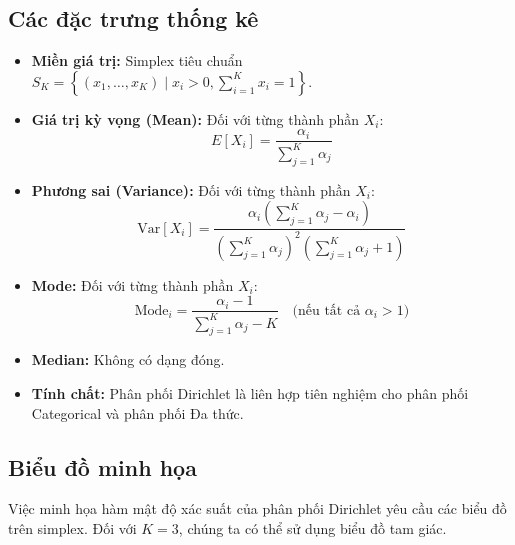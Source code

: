 	\subsection{Các đặc trưng thống kê}
	\begin{itemize}[leftmargin=*]
		\item \textbf{Miền giá trị:} Simplex tiêu chuẩn $S_K = \left\{ (x_1, \dots, x_K) \mid x_i > 0, \sum_{i=1}^K x_i = 1 \right\}$.
		\item \textbf{Giá trị kỳ vọng (Mean):} Đối với từng thành phần $X_i$:
		\[ E[X_i] = \frac{\alpha_i}{\sum_{j=1}^K \alpha_j} \]
		\item \textbf{Phương sai (Variance):} Đối với từng thành phần $X_i$:
		\[ \text{Var}[X_i] = \frac{\alpha_i \left( \sum_{j=1}^K \alpha_j - \alpha_i \right)}{\left( \sum_{j=1}^K \alpha_j \right)^2 \left( \sum_{j=1}^K \alpha_j + 1 \right)} \]
		\item \textbf{Mode:} Đối với từng thành phần $X_i$:
		\[ \text{Mode}_i = \frac{\alpha_i-1}{\sum_{j=1}^K \alpha_j - K} \quad \text{(nếu tất cả } \alpha_i > 1 \text{)} \]
		\item \textbf{Median:} Không có dạng đóng.
		\item \textbf{Tính chất:} Phân phối Dirichlet là liên hợp tiên nghiệm cho phân phối Categorical và phân phối Đa thức.
	\end{itemize}
	
	\subsection{Biểu đồ minh họa}
	Việc minh họa hàm mật độ xác suất của phân phối Dirichlet yêu cầu các biểu đồ trên simplex. Đối với $K=3$, chúng ta có thể sử dụng biểu đồ tam giác.
	
